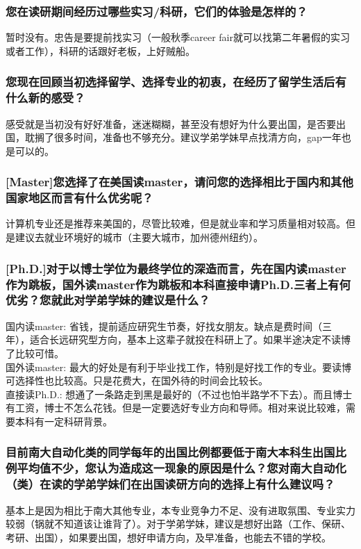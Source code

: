\documentclass[a4paper,UTF8]{book}
\begin{document}
    \subsubsection*{您在读研期间经历过哪些实习/科研，它们的体验是怎样的？}
    暂时没有。忠告是要提前找实习（一般秋季career fair就可以找第二年暑假的实习或者工作），科研的话跟好老板，上好贼船。

    \subsubsection*{您现在回顾当初选择留学、选择专业的初衷，在经历了留学生活后有什么新的感受？}
    感受就是当初没有好好准备，迷迷糊糊，甚至没有想好为什么要出国，是否要出国，耽搁了很多时间，准备也不够充分。建议学弟学妹早点找清方向，gap一年也是可以的。

    \subsubsection*{[Master]您选择了在美国读master，请问您的选择相比于国内和其他国家地区而言有什么优劣呢？}
    计算机专业还是推荐来美国的，尽管比较难，但是就业率和学习质量相对较高。但是建议去就业环境好的城市（主要大城市，加州德州纽约）。

    \subsubsection*{[Ph.D.]对于以博士学位为最终学位的深造而言，先在国内读master作为跳板，国外读master作为跳板和本科直接申请Ph.D.三者上有何优劣？您就此对学弟学妹的建议是什么？}
    国内读master: 省钱，提前适应研究生节奏，好找女朋友。缺点是费时间（三年），适合长远研究型方向，基本上这辈子就投在科研上了。如果半途决定不读博了比较可惜。\\
    国外读master: 最大的好处是有利于毕业找工作，特别是好找工作的专业。要读博可选择性也比较高。只是花费大，在国外待的时间会比较长。\\
    直接读Ph.D.: 想通了一条路走到黑是最好的（不过也怕半路学不下去）。而且博士有工资，博士不怎么花钱。但是一定要选好专业方向和导师。相对来说比较难，需要本科有一定科研背景。

    \subsubsection*{目前南大自动化类的同学每年的出国比例都要低于南大本科生出国比例平均值不少，您认为造成这一现象的原因是什么？您对南大自动化（类）在读的学弟学妹们在出国读研方向的选择上有什么建议吗？}
    基本上是因为相比于南大其他专业，本专业竞争力不足、没有进取氛围、专业实力较弱（锅就不知道该让谁背了）。对于学弟学妹，建议是想好出路（工作、保研、考研、出国），如果要出国，想好申请方向，及早准备，也能去不错的学校。
\end{document}
